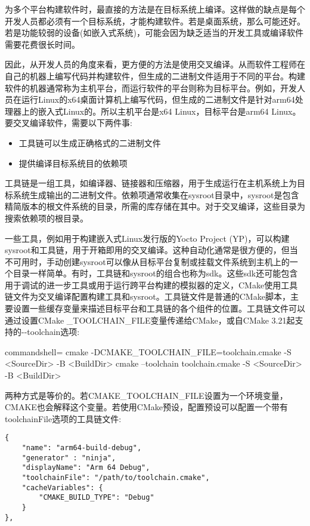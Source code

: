 为多个平台构建软件时，最直接的方法是在目标系统上编译。这样做的缺点是每个开发人员都必须有一个目标系统，才能构建软件。若是桌面系统，那么可能还好。若是功能较弱的设备(如嵌入式系统)，可能会因为缺乏适当的开发工具或编译软件需要花费很长时间。

因此，从开发人员的角度来看，更方便的方法是使用交叉编译。从而软件工程师在自己的机器上编写代码并构建软件，但生成的二进制文件适用于不同的平台。构建软件的机器通常称为主机平台，而运行软件的平台则称为目标平台。例如，开发人员在运行Linux的x64桌面计算机上编写代码，但生成的二进制文件是针对arm64处理器上的嵌入式Linux的。所以主机平台是x64 Linux，目标平台是arm64 Linux。要交叉编译软件，需要以下两件事:

\begin{itemize}
\item 
工具链可以生成正确格式的二进制文件

\item 
提供编译目标系统目的依赖项
\end{itemize}

工具链是一组工具，如编译器、链接器和压缩器，用于生成运行在主机系统上为目标系统生成输出的二进制文件。依赖项通常收集在sysroot目录中，sysroot是包含精简版本的根文件系统的目录，所需的库存储在其中。对于交叉编译，这些目录为搜索依赖项的根目录。

一些工具，例如用于构建嵌入式Linux发行版的Yocto Project (YP)，可以构建sysroot和工具链，用于开箱即用的交叉编译。这种自动化通常是很方便的，但当不可用时，手动创建sysroot可以像从目标平台复制或挂载文件系统到主机上的一个目录一样简单。有时，工具链和sysroot的组合也称为sdk。这些sdk还可能包含用于调试的进一步工具或用于运行跨平台构建的模拟器的定义，CMake使用工具链文件为交叉编译配置构建工具和sysroot。工具链文件是普通的CMake脚本，主要设置一些缓存变量来描述目标平台和工具链的各个组件的位置。工具链文件可以通过设置CMake \_TOOLCHAIN\_FILE变量传递给CMake，或自CMake 3.21起支持的-{}-toolchain选项:

\begin{tcblisting}{commandshell={}}
cmake -DCMAKE_TOOLCHAIN_FILE=toolchain.cmake -S <SourceDir> -B
  <BuildDir>
cmake --toolchain toolchain.cmake -S <SourceDir> -B <BuildDir>
\end{tcblisting}

两种方式是等价的。若CMAKE\_TOOLCHAIN\_FILE设置为一个环境变量，CMAKE也会解释这个变量。若使用CMake预设，配置预设可以配置一个带有toolchainFile选项的工具链文件:

\begin{lstlisting}[style=styleCMake]
{
	"name": "arm64-build-debug",
	"generator" : "ninja",
	"displayName": "Arm 64 Debug",
	"toolchainFile": "/path/to/toolchain.cmake",
	"cacheVariables": {
		"CMAKE_BUILD_TYPE": "Debug"
	}
},
\end{lstlisting}

